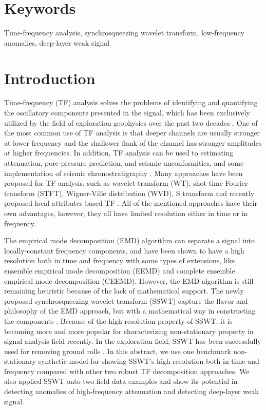 \section{Keywords}
Time-frequency analysis, synchrosqueezing wavelet transform, low-frequency anomalies, deep-layer weak signal


\section{Introduction}
Time-frequency (TF) analysis solves the problems of identifying and quantifying the oscillatory components presented in the signal, %
which has been exclusively utilized by the field of exploration geophysics over the past two decades \cite[]{partyka1999,castagna2003,reine2009,guochang20112}. One of the most common use of TF analysis is that deeper channels are usually stronger at lower frequency and the shallower flank of the channel has stronger amplitudes at higher frequencies. In addition, TF analysis can be used to estimating attenuation, pore-pressure prediction, and seismic unconformities, and some implementation of seismic chronostratigraphy \cite[]{tengfei2013}. Many approaches have been proposed for TF analysis, such as wavelet transform (WT), shot-time Fourier transform (STFT), Wigner-Ville distribution (WVD), S transform and recently proposed local attributes based TF \cite[]{guochang20112}. All of the mentioned approaches have their own advantages, however, they all have limited resolution either in time or in frequency.

The empirical mode decomposition (EMD) \cite[]{emd} algorithm can separate a signal into locally-constant frequency components, and have been shown to have a high resolution both in time and frequency with some types of extensions, like ensemble empirical mode decomposition (EEMD) and complete ensemble empirical mode decomposition (CEEMD). However, the EMD algorithm is still remaining heuristic because of the lack of mathematical support. The newly proposed synchrosqueezing wavelet transform (SSWT) capture the flavor and philosophy of the EMD approach, but with a mathematical way in constructing the components \cite[]{daubechies2011}. Because of the high-resolution property of SSWT, it is becoming more and more popular for characterizing non-stationary property in signal analysis field recently. In the exploration field, SSWT has been successfully used for removing ground rolls \cite[]{shang2013}. In this abstract, we use one benchmark non-stationary synthetic model for showing SSWT's high resolution both in time and frequency compared with other two robust TF decomposition approaches. We also applied SSWT onto two field data examples and show its potential in detecting anomalies of high-frequency attenuation and detecting deep-layer weak signal.  

